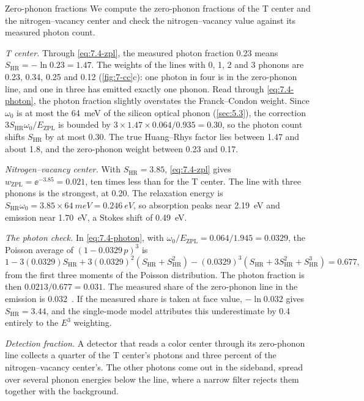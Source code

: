 \begin{workedexample}{Zero-phonon fractions}\label{we:7-zpl}
We compute the zero-phonon fractions of the T center and the nitrogen--vacancy center and check the nitrogen--vacancy value against its measured photon count.

\emph{T center.} Through \cref{eq:7.4-zpl}, the measured photon fraction 0.23 means $S_{\mathrm{HR}} = -\ln0.23 = 1.47$. The weights of the lines with 0, 1, 2 and 3 phonons are 0.23, 0.34, 0.25 and 0.12 (\cref{fig:7-cc}c): one photon in four is in the zero-phonon line, and one in three has emitted exactly one phonon. Read through \cref{eq:7.4-photon}, the photon fraction slightly overstates the Franck--Condon weight. Since $\omega_0$ is at most the \SI{64}{meV} of the silicon optical phonon (\cref{sec:5.3}), the correction $3S_{\mathrm{HR}}\omega_0/E_{\mathrm{ZPL}}$ is bounded by $3\times1.47\times0.064/0.935 = 0.30$, so the photon count shifts $S_{\mathrm{HR}}$ by at most 0.30. The true Huang--Rhys factor lies between 1.47 and about 1.8, and the zero-phonon weight between 0.23 and 0.17.

\emph{Nitrogen--vacancy center.} With $S_{\mathrm{HR}} = 3.85$, \cref{eq:7.4-zpl} gives $w_{\mathrm{ZPL}} = \ee^{-3.85} = 0.021$, ten times less than for the T center. The line with three phonons is the strongest, at 0.20. The relaxation energy is $S_{\mathrm{HR}}\omega_0 = 3.85\times\SI{64}{meV} = \SI{0.246}{eV}$, so absorption peaks near \SI{2.19}{eV} and emission near \SI{1.70}{eV}, a Stokes shift of \SI{0.49}{eV}.

\emph{The photon check.} In \cref{eq:7.4-photon}, with $\omega_0/E_{\mathrm{ZPL}} = 0.064/1.945 = 0.0329$, the Poisson average of $(1 - 0.0329\,p)^3$ is
\begin{equation*}
  1 - 3(0.0329)S_{\mathrm{HR}} + 3(0.0329)^2(S_{\mathrm{HR}} + S_{\mathrm{HR}}^2) - (0.0329)^3(S_{\mathrm{HR}} + 3S_{\mathrm{HR}}^2 + S_{\mathrm{HR}}^3) = 0.677 ,
\end{equation*}
from the first three moments of the Poisson distribution. The photon fraction is then $0.0213/0.677 = 0.031$. The measured share of the zero-phonon line in the emission is \num{0.032}~\cite[Sect.~3]{alkauskas2014first}. If the measured share is taken at face value, $-\ln0.032$ gives $S_{\mathrm{HR}} = 3.44$, and the single-mode model attributes this underestimate by 0.4 entirely to the $E^3$ weighting.

\emph{Detection fraction.} A detector that reads a color center through its zero-phonon line collects a quarter of the T center's photons and three percent of the nitrogen--vacancy center's. The other photons come out in the sideband, spread over several phonon energies below the line, where a narrow filter rejects them together with the background.
\end{workedexample}

